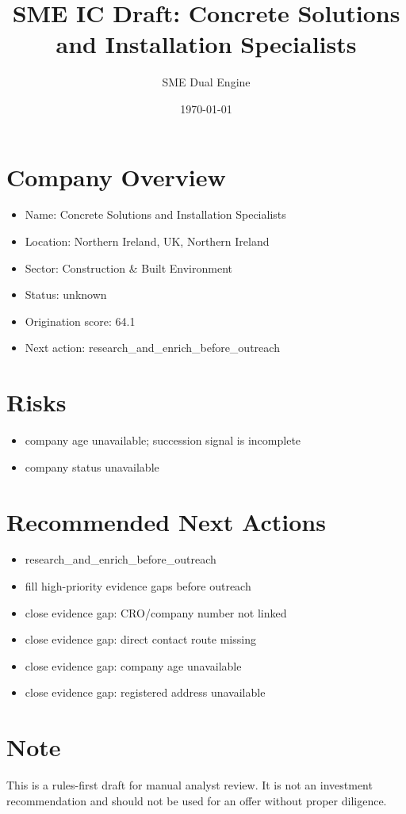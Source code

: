 \documentclass[11pt,a4paper]{article}
\title{SME IC Draft: Concrete Solutions and Installation Specialists}
\author{SME Dual Engine}
\date{\today}
\begin{document}
\maketitle
\section*{Company Overview}
\begin{itemize}[leftmargin=1.4em]
\item Name: Concrete Solutions and Installation Specialists
\item Location: Northern Ireland, UK, Northern Ireland
\item Sector: Construction \& Built Environment
\item Status: unknown
\item Origination score: 64.1
\item Next action: research\_and\_enrich\_before\_outreach
\end{itemize}
\section*{Risks}
\begin{itemize}[leftmargin=1.4em]
\item company age unavailable; succession signal is incomplete
\item company status unavailable
\end{itemize}
\section*{Recommended Next Actions}
\begin{itemize}[leftmargin=1.4em]
\item research\_and\_enrich\_before\_outreach
\item fill high-priority evidence gaps before outreach
\item close evidence gap: CRO/company number not linked
\item close evidence gap: direct contact route missing
\item close evidence gap: company age unavailable
\item close evidence gap: registered address unavailable
\end{itemize}
\section*{Note}
This is a rules-first draft for manual analyst review. It is not an investment
recommendation and should not be used for an offer without proper diligence.
\end{document}
